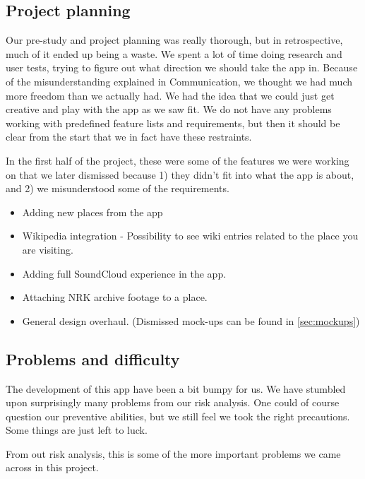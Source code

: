 	\subsection{Project planning}

Our pre-study and project planning was really thorough, but in retrospective, much of it ended up being a waste. We spent a lot of time doing research and user tests, trying to figure out what direction we should take the app in. Because of the misunderstanding explained in Communication, we thought we had much more freedom than we actually had. We had the idea that we could just get creative and play with the app as we saw fit. We do not have any problems working with predefined feature lists and requirements, but then it should be clear from the start that we in fact have these restraints.

In the first half of the project, these were some of the features we were working on that we later dismissed because 1) they didn't fit into what the app is about, and 2) we misunderstood some of the requirements.

\begin{itemize}
	\item Adding new places from the app
	\item Wikipedia integration - Possibility to see wiki entries related to the place you are visiting.
	\item Adding full SoundCloud experience in the app.
	\item Attaching NRK archive footage to a place. 
	\item General design overhaul.  (Dismissed mock-ups can be found in \ref{sec:mockups})
\end{itemize}

	\subsection{Problems and difficulty}

The development of this app have been a bit bumpy for us. We have stumbled upon surprisingly many problems from our risk analysis. One could of course question our preventive abilities, but we still feel we took the right precautions. Some things are just left to luck.

From out risk analysis, this is some of the more important problems we came across in this project. 

